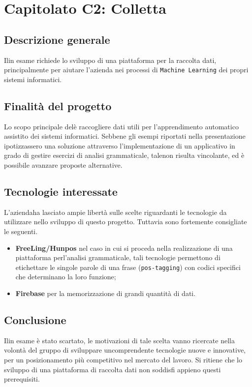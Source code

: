 \chapter{Capitolato C2: Colletta}
\section{Descrizione generale}
Ilin esame richiede lo sviluppo di una piattaforma per la raccolta dati, principalmente per aiutare l'azienda nei processi di \texttt{Machine Learning} dei propri sistemi informatici.

\section{Finalit\`a del progetto}
Lo scopo principale delè raccogliere dati utili per l'apprendimento automatico assistito dei sistemi informatici. Sebbene gli esempi riportati nella presentazione ipotizzassero una soluzione attraverso l'implementazione di un applicativo in grado di gestire esercizi di analisi grammaticale, talenon risulta vincolante, ed è possibile avanzare proposte alternative.

\section{Tecnologie interessate}
L'aziendaha lasciato ampie libertà sulle scelte riguardanti le tecnologie da utilizzare nello sviluppo di questo progetto. Tuttavia sono fortemente consigliate le seguenti.
\begin{itemize}
	\item \textbf{FreeLing/Hunpos} nel caso in cui si proceda nella realizzazione di una piattaforma perl'analisi grammaticale, tali tecnologie permettono di etichettare le singole parole di una frase (\texttt{pos-tagging}) con codici specifici che determinano la loro funzione;
	\item \textbf{Firebase} per la memorizzazione di grandi quantità di dati.
\end{itemize}
\section{Conclusione}
Ilin esame è stato scartato, le motivazioni di tale scelta vanno ricercate nella volontà del gruppo di sviluppare uncomprendente tecnologie nuove e innovative, per un posizionamento più competitivo nel mercato del lavoro. Si ritiene che lo sviluppo di una piattaforma di raccolta dati non soddisfi appieno questi prerequisiti. 